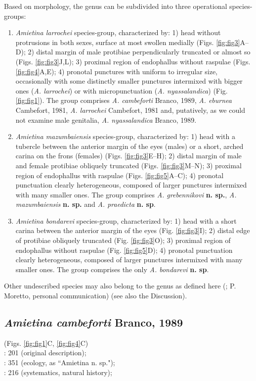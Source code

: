 \documentclass[fleqn,10pt,lineno]{wlpeerj}
\begin{document}
Based on morphology, the genus can be subdivided into three operational species-groups:
\begin{enumerate}
    \item \textit{Amietina larrochei} species-group, characterized by: 1) head without protrusions in both sexes, surface at most swollen medially (Figs. \ref{fig:fig3}A--D); 2) distal margin of male protibiae perpendicularly truncated or almost so (Figs. \ref{fig:fig3}J,L); 3) proximal region of endophallus without raspulae (Figs. \ref{fig:fig4}A,E); 4) pronotal punctures with uniform to irregular size, occasionally with some distinctly smaller punctures intermixed with bigger ones (\textit{A. larrochei}) or with micropunctuation (\textit{A. nyassalandica}) (Fig. \ref{fig:fig1}). The group comprises \textit{A. cambeforti} Branco, 1989, \textit{A. eburnea} Cambefort, 1981, \textit{A. larrochei} Cambefort, 1981 and, putatively, as we could not examine male genitalia, \textit{A. nyassalandica} Branco, 1989.
    \item \textit{Amietina mazumbaiensis} species-group, characterized by: 1) head with a tubercle between the anterior margin of the eyes (males) or a short, arched carina on the frons (females) (Figs. \ref{fig:fig3}E--H); 2) distal margin of male and female protibiae obliquely truncated (Figs. \ref{fig:fig3}M--N); 3) proximal region of endophallus with raspulae (Figs. \ref{fig:fig5}A--C); 4) pronotal punctuation clearly heterogeneous, composed of larger punctures intermixed with many smaller ones. The group comprises \textit{A. grebennikovi} \textbf{n. sp.}, \textit{A. mazumbaiensis} \textbf{n. sp.} and \textit{A. praedicta} \textbf{n. sp}.
    \item \textit{Amietina bondarevi} species-group, characterized by: 1) head with a short carina between the anterior margin of the eyes (Fig. \ref{fig:fig3}I); 2) distal edge of protibiae obliquely truncated (Fig. \ref{fig:fig3}O); 3) proximal region of endophallus without raspulae (Fig. \ref{fig:fig5}D); 4) pronotal punctuation clearly heterogeneous, composed of larger punctures intermixed with many smaller ones. The group comprises the only \textit{A. bondarevi} \textbf{n. sp}.
\end{enumerate}

Other undescribed species may also belong to the genus as defined here (\citealp{moretto2010onthophagus}; P. Moretto, personal communication) (see also the Discussion).



\subsection*{\textbf{\textit{Amietina cambeforti} Branco, 1989}}
(Figs. \ref{fig:fig1}C, \ref{fig:fig4}C)\\
\cite{branco1989deux}: 201 (original description);\\
\cite{nummelin1989dung}: 351 (ecology, as ``{Amietina} n. sp.");\\
\cite{davis2008african}: 216 (systematics, natural history);
\end{document}
